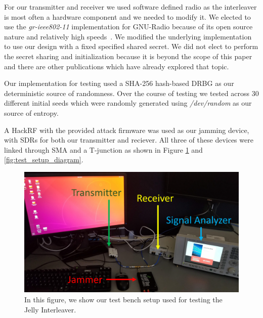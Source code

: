 \documentclass[sigconf]{acmart}
\begin{document}
For our transmitter and receiver we used software defined radio as the interleaver is most often a hardware component and we needed to modify it. We elected to use the \textit{gr-ieee802-11} implementation for GNU-Radio because of its open source nature and relatively high speeds~\cite{gr_ieee802}. We modified the underlying implementation to use our design with a fixed specified shared secret. We did not elect to perform the secret sharing and initialization because it is beyond the scope of this paper and there are other publications which have already explored that topic. 

Our implementation for testing used a SHA-256 hash-based DRBG as our deterministic source of randomness. Over the course of testing we tested across 30 different initial seeds which were randomly generated using \textit{/dev/random} as our source of entropy. 

A HackRF with the provided attack firmware was used as our jamming device, with SDRs for both our transmitter and reciever. All three of these devices were linked through SMA and a T-junction as shown in Figure \ref{fig:test_setup} and \ref{fig:test_setup_diagram}.

\begin{figure}[ht]
    \centering
    \includegraphics[width=\linewidth]{testing_setup.png}
    \caption{In this figure, we show our test bench setup used for testing the Jelly Interleaver.  }
    \label{fig:test_setup}
\end{figure}
\end{document}
